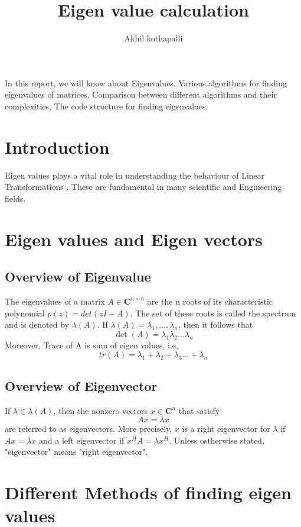 \documentclass[12pt]{article}
\title{\textbf{Eigen value calculation}}
\author{Akhil kothapalli}
\begin{document}
\maketitle
In this report, we will know about Eigenvalues, Various algorithms for finding eigenvalues of matrices, Comparison between different algorithms and their complexities, The code structure for finding eigenvalues.
\section{Introduction}
  Eigen values plays a vital role in understanding the behaviour of Linear Transformations . These are fundamental in many scientific and Engineering fields.\\
  

\section{Eigen values and Eigen vectors}
    \subsection{Overview of Eigenvalue}
       The eigenvalues of a matrix $A \in \mathbf{C}^{n \times n}$ are the n roots of its characteristic polynomial $p(z)=det(zI-A)$. The set of these roots is called the spectrum and is denoted by $\lambda(A)$. If $\lambda(A)={\lambda_1,\dots,\lambda_n}$, then it follows that
     \begin{equation*}
    \det(A) = \lambda_1 \lambda_2 \dots \lambda_n
\end{equation*}
Moreover, Trace of A is sum of eigen values, i.e,
\begin{equation*}
    tr(A)=\lambda_1+\lambda_2+\lambda_3\dots+\lambda_n
\end{equation*}

    \subsection{Overview of Eigenvector}
        If $\lambda\in\lambda(A)$, then the nonzero vectors $x\in\mathbf{C}^n$ that satisfy
        \begin{equation*}
        Ax=\lambda x
        \end{equation*}
        are referred to as eigenvectors. More precisely, $x$ is a right eigenvector for $\lambda$ if $ Ax=\lambda x$ and a left eigenvector if $x^HA=\lambda x^H$. Unless ostherwise stated, "eigenvector" means "right eigenvector".
\section{Different Methods of finding eigen values}
\end{document}
